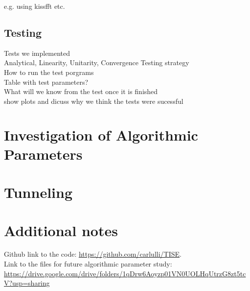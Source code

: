 \documentclass{article}
\begin{document}
e.g. using kissfft etc.

\subsection{Testing}
Tests we implemented \\
Analytical, Linearity, Unitarity, Convergence
Testing strategy \\
How to run the test porgrams \\
Table with test parameters? \\
What will we know from the test once it is finished \\
show plots and dicuss why we think the tests were sucessful \\




\section{Investigation of Algorithmic Parameters}\label{algrtmcprmtrs}




\section{Tunneling}


\clearpage
\section{Additional notes}
Github link to the code: \hyperlink{https://github.com/carlulli/TISE}{https://github.com/carlulli/TISE}.\\
Link to the files for future algorithmic parameter study:\\
\hyperlink{https://drive.google.com/drive/folders/1qDrw6Aoyzp01VN0UOLHqUtrzG8zt5tcV?usp=sharing}{https://drive.google.com/drive/folders/1qDrw6Aoyzp01VN0UOLHqUtrzG8zt5tcV?usp=sharing}

\end{document}
